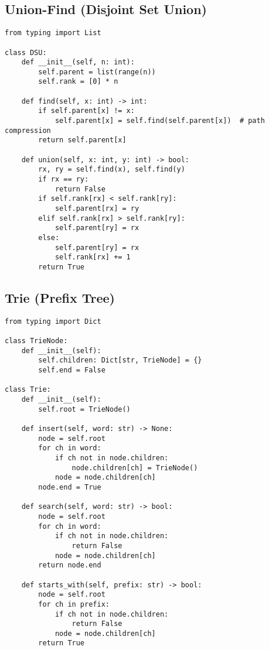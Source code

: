 \documentclass[11pt]{article}
\begin{document}
\subsection{Union-Find (Disjoint Set Union)}
\begin{lstlisting}[style=py,caption={Path compression + union by rank}]
from typing import List

class DSU:
    def __init__(self, n: int):
        self.parent = list(range(n))
        self.rank = [0] * n

    def find(self, x: int) -> int:
        if self.parent[x] != x:
            self.parent[x] = self.find(self.parent[x])  # path compression
        return self.parent[x]

    def union(self, x: int, y: int) -> bool:
        rx, ry = self.find(x), self.find(y)
        if rx == ry:
            return False
        if self.rank[rx] < self.rank[ry]:
            self.parent[rx] = ry
        elif self.rank[rx] > self.rank[ry]:
            self.parent[ry] = rx
        else:
            self.parent[ry] = rx
            self.rank[rx] += 1
        return True
\end{lstlisting}

\subsection{Trie (Prefix Tree)}
\begin{lstlisting}[style=py,caption={Trie with insert/search/prefix}]
from typing import Dict

class TrieNode:
    def __init__(self):
        self.children: Dict[str, TrieNode] = {}
        self.end = False

class Trie:
    def __init__(self):
        self.root = TrieNode()

    def insert(self, word: str) -> None:
        node = self.root
        for ch in word:
            if ch not in node.children:
                node.children[ch] = TrieNode()
            node = node.children[ch]
        node.end = True

    def search(self, word: str) -> bool:
        node = self.root
        for ch in word:
            if ch not in node.children:
                return False
            node = node.children[ch]
        return node.end

    def starts_with(self, prefix: str) -> bool:
        node = self.root
        for ch in prefix:
            if ch not in node.children:
                return False
            node = node.children[ch]
        return True
\end{lstlisting}
\end{document}
